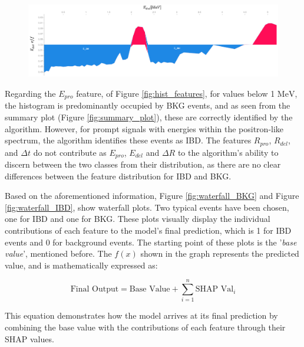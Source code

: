 \begin{figure}[h!]
	\centering
	\includegraphics[width=\linewidth]{Images/Shap/E_del_force_plot.png}
	\label{fig:E_del_force_plot}
\end{figure}

Regarding the $E_{pro}$ feature, of Figure \ref{fig:hist_features}, for values below 1 $\si{\mega\electronvolt}$, the histogram is predominantly occupied by BKG events, and as seen from the summary plot (Figure \ref{fig:summary_plot}), these are correctly identified by the algorithm. However, for prompt signals with energies within the positron-like spectrum, the algorithm identifies these events as IBD. The features $R_{pro}$, $R_{del}$, and $\Delta t$ do not contribute as $E_{pro}$, $E_{del}$ and $\Delta R$ to the algorithm's ability to discern between the two classes from their distribution, as there are no clear differences between the feature distribution for IBD and BKG.


Based on the aforementioned information, Figure \ref{fig:waterfall_BKG} and Figure \ref{fig:waterfall_IBD}, show waterfall plots. Two typical events have been chosen, one for IBD and one for BKG.
These plots visually display the individual contributions of each feature to the model's final prediction, which is 1 for IBD events and 0 for background events. The starting point of these plots is the '\textit{base value}', mentioned before. The $f(x)$ shown in the graph represents the predicted value, and is mathematically expressed as:

\begin{equation}
	\text{Final Output} = \text{Base Value} + \sum_{i=1}^{n} \text{SHAP Val}_{i}
\end{equation}

This equation demonstrates how the model arrives at its final prediction by combining the base value with the contributions of each feature through their SHAP values.

